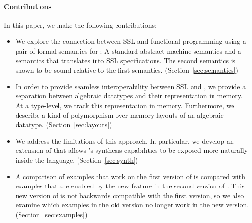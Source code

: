 \paragraph{Contributions} In this paper, we make the following contributions:
\begin{itemize}
  \item We explore the connection between SSL and functional programming using a pair of formal semantics for \Pika: A standard abstract machine semantics and a
    semantics that translates \Pika{} into SSL specifications. The second semantics is shown to be sound relative to the first semantics. (Section~\ref{sec:semantics})

  \item In order to provide seamless interoperability between SSL and \Pika, we provide a separation between algebraic datatypes and their representation in memory.
    At a type-level, we track this representation in memory. Furthermore, we describe a kind of polymorphism over memory layouts of an algebraic datatype. (Section~\ref{sec:layouts})

  \item We address the limitations of this approach. In particular, we develop an extension of \Pika{} that allows \SuSLik's synthesis capabilities to be exposed more naturally inside the \Pika{} language. (Section~\ref{sec:synth})

  \item A comparison of examples that work on the first version of \Pika{} is compared with examples that are enabled by the new feature in the second version of \Pika. This new version of \Pika{} is not backwards compatible with the first version, so we also examine which examples in the old version no longer work in the new version. (Section~\ref{sec:examples})
\end{itemize}


